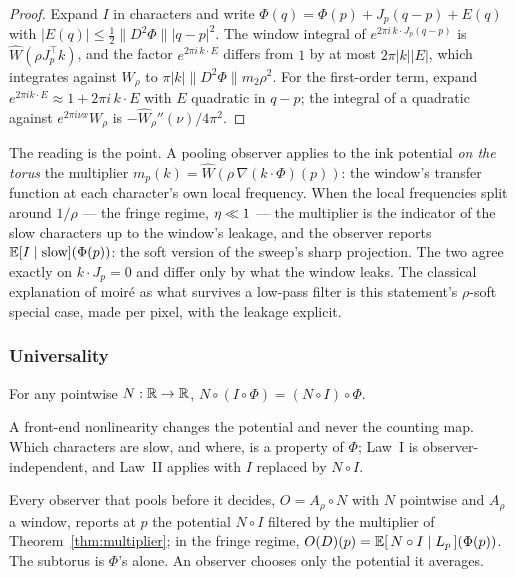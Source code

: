 \begin{proof}
Expand $I$ in characters and write $\Phi(q)=\Phi(p)+J_p(q-p)+E(q)$ with
$|E(q)|\le\tfrac12\lVert D^2\Phi\rVert|q-p|^2$. The window integral of
$e^{2\pi i\,k\cdot J_p(q-p)}$ is $\widehat W(\rho J_p^{\top}k)$, and the factor
$e^{2\pi i\,k\cdot E}$ differs from $1$ by at most $2\pi|k||E|$, which
integrates against $W_\rho$ to $\pi|k|\lVert D^2\Phi\rVert m_2\rho^2$. For the
first-order term, expand $e^{2\pi i k\cdot E}\approx1+2\pi i\,k\cdot E$ with
$E$ quadratic in $q-p$; the integral of a quadratic against
$e^{2\pi i\nu x}W_\rho$ is $-\widehat W_\rho''(\nu)/4\pi^2$.
\end{proof}

The reading is the point. A pooling observer applies to the ink potential
\emph{on the torus} the multiplier $m_p(k)=\widehat W(\rho\,\nabla(k\cdot\Phi)(p))$:
the window's transfer function at each character's own local frequency. When
the local frequencies split around $1/\rho$ --- the fringe regime, $\eta\ll1$
--- the multiplier is the indicator of the slow characters up to the window's
leakage, and the observer reports $\mathbb{E}[I\mid\text{slow}](\Phi(p))$: the soft
version of the sweep's sharp projection. The two agree exactly on
$k\cdot J_p=0$ and differ only by what the window leaks. The classical
explanation of moir\'e as what survives a low-pass filter is this statement's
$\rho$-soft special case, made per pixel, with the leakage explicit.

\subsubsection{Universality}

\begin{lemma}
\label{lem:transport}
For any pointwise $N:\mathbb{R}\to\mathbb{R}$, $N\circ(I\circ\Phi)=(N\circ I)\circ\Phi$.
\end{lemma}

A front-end nonlinearity changes the potential and never the counting map.
Which characters are slow, and where, is a property of $\Phi$; Law~I is
observer-independent, and Law~II applies with $I$ replaced by $N\circ I$.

\begin{theorem}
\label{thm:universality}
Every observer that pools before it decides, $O=A_\rho\circ N$ with $N$
pointwise and $A_\rho$ a window, reports at $p$ the potential $N\circ I$
filtered by the multiplier of Theorem~\ref{thm:multiplier}; in the fringe
regime, $O(D)(p)=\mathbb{E}[\,N\circ I\mid L_p\,](\Phi(p))$. The subtorus is
$\Phi$'s alone. An observer chooses only the potential it averages.
\end{theorem}

